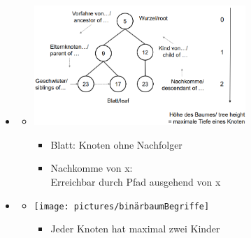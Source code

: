 \documentclass[
    12pt,
    a4paper,
    ngerman,
    color=3b,%
    marginpar=false,
    colorback=false,
    leqno,
]{tudaexercise}
\begin{document}
\begin{itemize}
    \item {}
          \begin{itemize}
              \item[]
                    \begin{minipage}[t]{0.45\textwidth}
                        \includegraphics[width=8cm]{pictures/baumBegriffe1.PNG}
                    \end{minipage}
                    \begin{minipage}[t]{0.45\textwidth}
                        \vspace{-3.5cm}
                        \begin{itemize}
                            \item Blatt: Knoten ohne Nachfolger
                            \item Nachkomme von x: \\
                                  Erreichbar durch Pfad ausgehend von x
                        \end{itemize}
                    \end{minipage}
          \end{itemize}
          \clearpage
    \item {}
          \begin{itemize}
              \item[]
                    \begin{minipage}[t]{0.45\textwidth}
                        \texttt{[image: pictures/binärbaumBegriffe]}
                    \end{minipage}
                    \begin{minipage}[t]{0.45\textwidth}
                        \vspace{-4.5cm}
                        \begin{itemize}
                            \item Jeder Knoten hat maximal zwei Kinder \\

\end{itemize}
\end{minipage}
\end{itemize}
\end{itemize}
\end{document}
